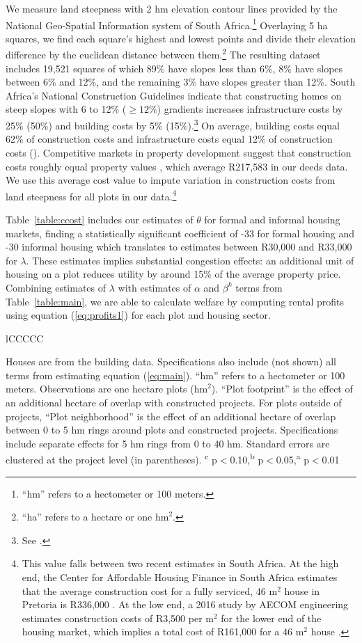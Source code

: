 \documentclass[12pt]{article}
\newcommand{\regtext}{
	``hm'' refers to a hectometer or 100 meters. Observations are one hectare plots ($\text{hm}^{2}$).
``Plot footprint'' is the effect of an additional hectare of overlap with constructed projects.  
For plots outside of projects, ``Plot neighborhood'' is the effect of an additional hectare of overlap between 0 to 5 hm rings around plots and constructed projects.  Specifications include separate effects for 5 hm rings from 0 to 40 hm.
Standard errors are clustered at the project level (in parentheses). 
\textsuperscript{c} p$<$0.10,\textsuperscript{b} p$<$0.05,\textsuperscript{a} p$<$0.01 \,\,
}
\newcommand{\hmref}{
	``hm'' refers to a hectometer or 100 meters.
}
\newcommand{\haref}{
	``ha'' refers to a hectare or one $\text{hm}^{2}$.
}
\begin{document}
We measure land steepness with 2 hm elevation contour lines provided by the National Geo-Spatial Information system of South Africa.\footnote{\hmref}   Overlaying 5 ha squares, we find each square's highest and lowest points and divide their elevation difference by the euclidean distance between them.\footnote{\haref}   The resulting dataset includes 19,521 squares of which 89\% have slopes less than 6\%, 8\% have slopes between 6\% and 12\%, and the remaining 3\% have slopes greater than 12\%.  South Africa's National Construction Guidelines indicate that constructing homes on steep slopes with 6 to 12\% ($\geq12\%$) gradients increases infrastructure costs by 25\% (50\%) and building costs by 5\% (15\%).\footnote{See \cite{redbook}.}  On average, building costs equal 62\% of construction costs and infrastructure costs equal 12\% of construction costs (\cite{cahfcosts}).  Competitive markets in property development suggest that construction costs roughly equal property values \citep{cahfcosts}, which average R217,583 in our deeds data.  We use this average cost value to impute variation in construction costs from land steepness for all plots in our data.\footnote{This value falls between two recent estimates in South Africa.  At the high end, the Center for Affordable Housing Finance in South Africa estimates that the average construction cost for a fully serviced, 46 $\text{m}^{2}$ house  in Pretoria is R336,000 \citep{cahfcosts}.  At the low end, a 2016 study by AECOM engineering estimates construction costs of R3,500 per $\text{m}^{2}$ for the lower end of the housing market, which implies a total cost of R161,000 for a 46 $\text{m}^{2}$ house \citep{aecom}.}  

Table~\ref{table:ccost} includes our estimates of $\theta$ for formal and informal housing markets, finding a statistically significant coefficient of -33 for formal housing and -30 informal housing which translates to estimates between R30,000 and R33,000 for $\lambda$.  These estimates implies substantial congestion effects: an additional unit of housing on a plot reduces utility by around 15\% of the average property price.  Combining estimates of $\lambda$ with estimates of $\alpha$ and $\beta^{k}$ terms from Table~\ref{table:main}, we are able to calculate welfare by computing rental profits using equation (\ref{eq:profits1}) for each plot and housing sector.

\begin{table}
\small
\centering
\caption{Construction Cost}\label{table:ccost}
\vspace{-2mm}
\begin{threeparttable}
\begin{tabular}{lCCCCC}
\toprule

\bottomrule
\end{tabular}
\begin{tablenotes}
\item \footnotesize  Houses are from the building data. Specifications also include (not shown) all terms from estimating equation (\ref{eq:main}).  \regtext
\end{tablenotes}
\end{threeparttable}
\end{table}
\end{document}
